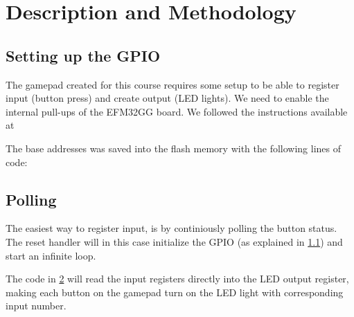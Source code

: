 \section{Description and Methodology}
\subsection{Setting up the GPIO}\label{subsection:gpio_setup}
The gamepad created for this course requires some setup to be able to register input (button press) and create output (LED lights). We need to enable the internal pull-ups of the EFM32GG board. We followed the instructions available at \cite[p. 24]{compendium}

\begin{figure}[h]
	
\end{figure}

The base addresses was saved into the flash memory with the following lines of code:
\begin{figure}[h]
	
	\label{code:base_addresses.s}
\end{figure}


	\subsection{Polling}
	The easiest way to register input, is by continiously polling the button status. The reset handler will in this case initialize the GPIO (as explained in \ref{subsection:gpio_setup}) and start an infinite loop.

	\begin{figure}[h]
		
		\label{code:polling_reset_handler.s}
	\end{figure}
	The code in \ref{code:polling_reset_handler.s} will read the input registers directly into the LED output register, making each button on the gamepad turn on the LED light with corresponding input number.
	
